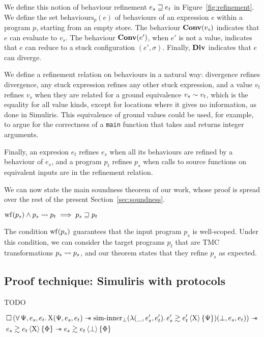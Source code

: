 We define this notion of behaviour refinement $e_s \sqsupseteq e_t$ in Figure~\ref{fig:refinement}.
%
We define the set $\mathrm{behaviours}_p(e)$ of behaviours of an expression $e$ within a program $p$, starting from an empty store.
%
The behaviour $\constr{Conv}(v_s)$ indicates that $e$ can evaluate to $v_s$.
%
The behaviour $\constr{Conv}(e')$, when $e'$ is not a value, indicates that $e$ can reduce to a stuck configuration $(e', \sigma)$.
%
Finally, $\constr{Div}$ indicates that $e$ can diverge.

We define a refinement relation on behaviours in a natural way: divergence refines divergence, any stuck expression refines any other stuck expression, and a value $v_t$ refines $v_s$ when they are related for a ground equivalence $v_s \sim v_t$, which is the equality for all value kinds, except for locations where it gives no information, as done in Simuliris.
%
This equivalence of ground values could be used, for example, to argue for the correctness of a \texttt{main} function that takes and returns integer arguments.

Finally, an expresion $e_t$ refines $e_s$ when all its behaviours are refined by a behaviour of $e_s$, and a program $p_t$ refines $p_s$ when calls to source functions on equivalent inputs are in the refinement relation.




We can now state the main soundness theorem of our work, whose proof is spread over the rest of the present Section~\ref{sec:soundness}.

\begin{theorem}[Soundness]
    $
        \wf{p_s} \wedge p_s \tmc p_t \implies
        p_s \refined p_t
    $
\end{theorem}

The condition $\wf{p_s}$ guarantees that the input program $p_s$ is well-scoped. Under this condition, we can consider the target programs $p_t$ that are TMC transformations $p_s \rightsquigarrow p_s$, and our theorem states that they refine $p_s$ as expected.

\subsection{Proof technique: Simuliris with protocols}

TODO

\clearpage

\begin{theorem}
    \begin{align*}
            &
            \iPersistent \left(
                \forall \Psi, e_s, e_t \ldotp
                \Chi (\Psi, e_s, e_t) \iSepImp
                \mathrm{sim \mathhyphen inner}_\bot (\lambdaAbs (\_, e_s', e_t') \ldotp \iSim[\Chi]{\Psi}{e_s'}{e_t'}) (\bot, e_s, e_t)
            \right) \iSepImp
        \\
            &
            \iSim[\Chi]{\Phi}{e_s}{e_t} \iSepImp
            \iSim[\bot]{\Phi}{e_s}{e_t}
    \end{align*}
\end{theorem}

